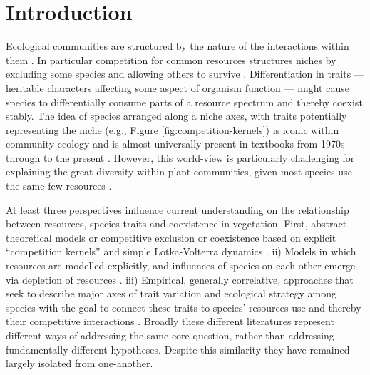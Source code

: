 \documentclass[a4paper,11pt]{article}
\begin{document}
\section{Introduction}

Ecological communities are structured by the nature of the
interactions within them \citep{Schluter-2000}.
In particular competition for common resources structures niches by
excluding some species and allowing others to survive
\citep[e.g.][]{Gause-1934,Lack-1947,MacArthur-1967}.
%
Differentiation in traits --- heritable characters affecting some aspect
of organism function --- might cause species to differentially consume
parts of a resource spectrum and thereby coexist stably.
The idea of species arranged along a niche axes, with traits potentially
representing the niche (e.g., Figure
\ref{fig:competition-kernels}) is iconic within community ecology and
is almost universally present in textbooks from 1970s through to the
present \citep[e.g.,][]{Krebs-1972, Ricklefs-1973, Ricklefs-1999,
  Krebs-2013}.
%
However, this world-view is particularly challenging for explaining
the great diversity within plant communities, given most species use
the same few resources \citep[e.g.,][]{Whittaker-1970, Grime-1979,
  Hubbell-2001, Westoby-2002}.

At least three perspectives influence current understanding on the
relationship between resources, species traits and coexistence in
vegetation.
%
First, abstract theoretical models or competitive exclusion or
coexistence based on explicit ``competition kernels'' and simple
Lotka-Volterra dynamics
\citep[e.g.][]{MacArthur-1967,Case-1982,Dieckmann-1999,Leimar-2013}.
%
ii) Models in which resources are modelled explicitly, and influences of species
on each other emerge via depletion of resources
\citep[e.g.][]{Tilman-1977, Huston-1987, Kohyama-1993, Falster-2011}.
%
iii) Empirical, generally correlative, approaches that seek to
describe major axes of trait variation and ecological strategy among
species with the goal to connect these traits to species' resources use and thereby their
competitive interactions
\citep[e.g.][]{Grime-1979, Weiher-1999, Westoby-2002}.
%
%
%
Broadly these different literatures represent different ways of
addressing the same core question, rather than addressing fundamentally
different hypotheses.  Despite this similarity they have remained
largely isolated from one-another.
\end{document}
